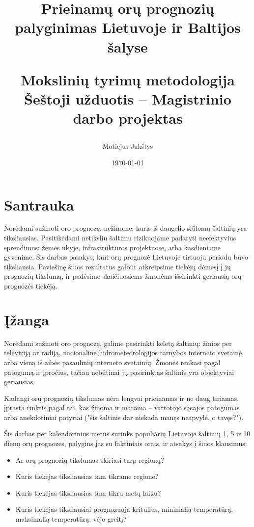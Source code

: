 \documentclass{article}
\title{
    Prieinamų orų prognozių palyginimas Lietuvoje ir Baltijos šalyse \\ \vspace{4mm}

    \large Mokslinių tyrimų metodologija\\
    Šeštoji užduotis -- Magistrinio darbo projektas
}
\author{Motiejus Jakštys}
\date{\today}
\begin{document}
\maketitle

\newpage

\section{Santrauka}

Norėdami sužinoti oro prognozę, nežinome, kuris iš daugelio siūlomų šaltinių
yra tiksliausias. Pasitikėdami netiksliu šaltiniu rizikuojame padaryti
neefektyvius sprendimus: žemės ūkyje, infrastruktūros projektuose, arba
kasdieniame gyvenime. Šis darbas pasakys, kuri orų prognozė Lietuvoje tirtuoju
periodu buvo tiksliausia. Paviešinę šiuos rezultatus galbūt atkreipsime tiekėjų
dėmesį į jų prognozių tikslumą, ir padėsime skaičiuosiems žmonėms išsirinkti
geriausią orų prognozės tiekėją.

\section{Įžanga}

Norėdami sužinoti oro prognozę, galime pasirinkti keletą šaltinių: žinios per
televiziją ar radiją, nacionalinė hidrometeorologijos tarnybos interneto
svetainė, arba vieną iš aibės pasaulinių interneto svetainių. Žmonės renkasi
pagal patogumą ir įpročius, tačiau nebūtinai jų pasirinktas šaltinis yra
objektyviai geriausias.

Kadangi orų prognozių tikslumas nėra lengvai prieinamas ir ne daug tiriamas,
įprasta rinktis pagal tai, kas žinoma ir matoma -- vartotojo sąsajos patogumas
arba anekdotiniai potyriai ("šis šaltinis dar niekada manęs neapvylė, o
tavęs?").

Šis darbas per kalendorinius metus surinks populiarių Lietuvoje šaltinių 1, 5
ir 10 dienų orų prognozes, palygins jas su faktiniais orais, ir atsakys į šiuos
klausimus:

\begin{itemize}
    \item Ar orų prognozių tikslumas skiriasi tarp regionų?
    \item Kuris tiekėjas tiksliausias tam tikrame regione?
    \item Kuris tiekėjas tiksliausias tam tikru metų laiku?
    \item Kuris tiekėjas tiksliausiai prognozuoja kritulius, minimalią
        temperatūrą, maksimalią temperatūrą, vėjo greitį?
\end{itemize}
\end{document}
